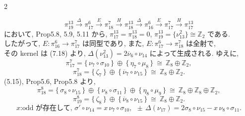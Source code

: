 \documentclass[10pt, leqno]{ltjsarticle}
\newcommand{\ov}[1]{\overline{#1}}
\newcommand{\gen}[1]{\{#1\}}       %
\newcommand{\pit}[2]{\pi_{#1}^{#2}}
\numberwithin{equation}{section}
\theoremstyle{plain}
\theoremstyle{definition}
\theoremstyle{remark}
\begin{document}
\newpage

\begin{paracol}{2}

\[
  \pit{19}{13}\xrightarrow{\ \Delta\ }
  \pit{17}{6}\xrightarrow{\ E\ }
  \pit{18}{7}\xrightarrow{\ H\ }
  \pit{18}{13}\xrightarrow{\ \Delta\ }
  \pit{16}{6}\xrightarrow{\ E\ }
  \pit{17}{7}\xrightarrow{\ H\ }
  \pit{17}{13}
\]
において,  Prop5.8, 5.9, 5.11 から,
\(\pit{17}{13}=\pit{18}{13}=0\), 
\(\pit{19}{13}=\gen{\nu_{13}^{2}}\cong\mathbb Z_{2}\) である. \\
したがって,
\(E:\pit{16}{6}\to\pit{17}{7}\) は同型であり, 
また, \(E:\pit{17}{6}\to\pit{18}{7}\) は全射で, \\
その kernel は (7.18) より,
\(\Delta(\nu_{13}^{2})
=2\ov{\nu}_{6}\circ \nu_{14}\) によって生成される. 
ゆえに,
\[
  \pit{17}{7}=\gen{\,\nu_{7}\circ\sigma_{10}\,}\ \oplus\ 
              \gen{\,\eta_{7}\circ\mu_{8}\,}\ \cong\ \mathbb Z_{8}\oplus\mathbb Z_{2},
\]
\[
\pit{18}{7}=\gen{\,\zeta_{7}\,}\ \oplus\ \gen{\,\overline{\nu}_{7}\circ \nu_{15}\,}
  \ \cong\ \mathbb Z_{8}\oplus\mathbb Z_{2}.
\]
(5.15),  Prop5.6,  Prop5.8 より,
\[
  \pit{18}{8}=\gen{\,\sigma_{8}\circ \nu_{15}\,}\ \oplus\
              \gen{\,\nu_{8}\circ\sigma_{11}\,}\ \oplus\
              \gen{\,\eta_{8}\circ\mu_{9}\,}
    \ \cong\ \mathbb Z_{8}\oplus\mathbb Z_{8}\oplus\mathbb Z_{2},
\]
\[
  \pit{19}{8}=\gen{\,\zeta_{8}\,}\ \oplus\ \gen{\,\overline{\nu}_{8}\circ \nu_{15}\,}
    \ \cong\ \mathbb Z_{8}\oplus\mathbb Z_{2}.
\]
\begin{equation}
x \text{:odd が存在して, }
\sigma'\circ \nu_{14}=x\,\nu_{7}\circ\sigma_{10},\ \
\pm\,\Delta(\nu_{17})=2\sigma_{8}\circ \nu_{15}-x\,\nu_{8}\circ\sigma_{11} .
\end{equation}


\end{paracol}
\end{document}
